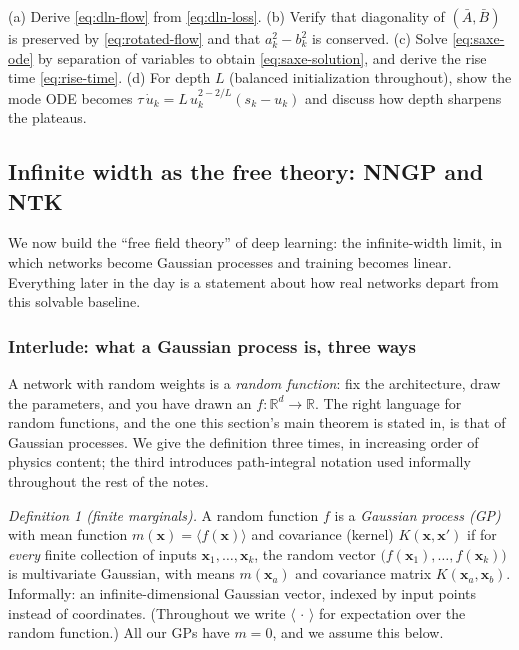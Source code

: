 \documentclass[11pt]{article}
\newcommand{\R}{\mathbb{R}}
\newcommand{\bv}[1]{\boldsymbol{#1}}
\begin{document}
\begin{exercise}
\label{ex:dln}
(a) Derive \cref{eq:dln-flow} from \cref{eq:dln-loss}. (b) Verify that
diagonality of $(\bar A, \bar B)$ is preserved by \cref{eq:rotated-flow}
and that $a_k^2 - b_k^2$ is conserved. (c) Solve \cref{eq:saxe-ode} by
separation of variables to obtain \cref{eq:saxe-solution}, and derive the
rise time \cref{eq:rise-time}. (d) For depth $L$ (balanced initialization
throughout), show the mode ODE becomes $\tau\,\dot u_k = L\,
u_k^{2 - 2/L}(s_k - u_k)$ and discuss how depth sharpens the plateaus.
\end{exercise}

\subsection{Infinite width as the free theory: NNGP and NTK}
\label{sec:ntk}

We now build the ``free field theory'' of deep learning: the infinite-width
limit, in which networks become Gaussian processes and training becomes
linear. Everything later in the day is a statement about how real networks
depart from this solvable baseline.

\subsubsection{Interlude: what a Gaussian process is, three ways}
\label{sec:gp-defs}

A network with random weights is a \emph{random function}: fix the
architecture, draw the parameters, and you have drawn an
$f: \R^d \to \R$. The right language for random functions, and the one
this section's main theorem is stated in, is that of Gaussian processes.
We give the definition three times, in increasing order of physics
content; the third introduces path-integral notation used informally
throughout the rest of the notes.

\emph{Definition 1 (finite marginals).} A random function $f$ is a
\emph{Gaussian process (GP)} with mean function $m(\bv{x}) =
\langle f(\bv{x})\rangle$ and covariance (kernel) $K(\bv{x},\bv{x}')$ if
for \emph{every} finite collection of inputs $\bv{x}_1, \dots,
\bv{x}_k$, the random vector $\bigl(f(\bv{x}_1), \dots,
f(\bv{x}_k)\bigr)$ is multivariate Gaussian, with means $m(\bv{x}_a)$ and
covariance matrix $K(\bv{x}_a, \bv{x}_b)$. Informally: an
infinite-dimensional Gaussian vector, indexed by input points instead of
coordinates. (Throughout we write $\langle\,\cdot\,\rangle$ for
expectation over the random function.) All our GPs have $m = 0$, and we
assume this below.
\end{document}
